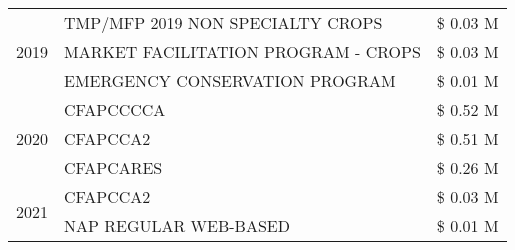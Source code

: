 \begin{tabular}{llr}
\cline{1-3}
\multirow[t]{3}{*}{2019} & TMP/MFP 2019 NON SPECIALTY CROPS & \$ 0.03 M \\
 & MARKET FACILITATION PROGRAM - CROPS & \$ 0.03 M \\
 & EMERGENCY CONSERVATION PROGRAM & \$ 0.01 M \\
\cline{1-3}
\multirow[t]{3}{*}{2020} & CFAPCCCCA & \$ 0.52 M \\
 & CFAPCCA2 & \$ 0.51 M \\
 & CFAPCARES & \$ 0.26 M \\
\cline{1-3}
\multirow[t]{2}{*}{2021} & CFAPCCA2 & \$ 0.03 M \\
 & NAP REGULAR WEB-BASED & \$ 0.01 M \\
\cline{1-3}
\bottomrule
\end{tabular}
